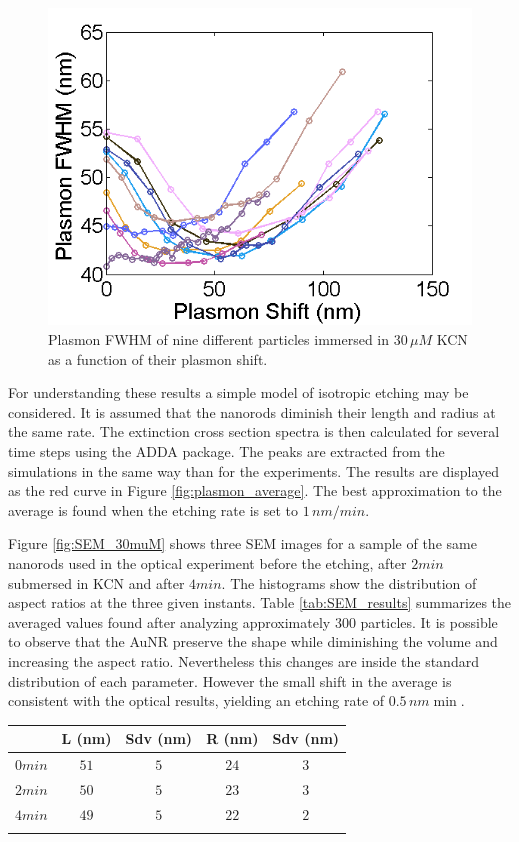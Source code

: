 \documentclass[twocolumn]{article}
\begin{document}
\begin{figure}[hbt]
 \centering
 \includegraphics[width=0.95\linewidth]{fwhm_several.png}
 \caption{Plasmon FWHM of nine different particles immersed in $30\,\mu M$ KCN
 as a function of their plasmon shift.}
 \label{fig:FWHM}
\end{figure}

For understanding these results a simple model of isotropic etching may be
considered. It is assumed that the nanorods diminish their length and radius at
the same rate. The extinction cross section spectra is then calculated for
several time steps using the ADDA package. The peaks are extracted from the
simulations in the same way than for the experiments. The results are displayed
as the red curve in Figure \ref{fig:plasmon_average}. The best approximation to
the average is found when the etching rate is set to $1\,nm/min$.

Figure \ref{fig:SEM_30muM} shows three SEM images for a sample of the same
nanorods used in the optical experiment before the etching, after $2min$
submersed in KCN and after $4min$. The histograms show the distribution of
aspect ratios at the three given instants. Table \ref{tab:SEM_results}
summarizes the averaged values found after analyzing approximately $300$
particles. It is possible to observe that the AuNR preserve the shape while
diminishing the volume and increasing the aspect ratio. Nevertheless this
changes are inside the standard distribution of each parameter. However the
small shift in the average is consistent with the optical results, yielding an
etching rate of $0.5\,nm\min$.

\begin{tabular*}{0.48\textwidth}{c c c c c}
 $\,$ & L (nm) & Sdv (nm) & R (nm) & Sdv (nm) \\\hline
 $0min$ & $51$ & $5$ & $24$ & $3$ \\ 
 $2min$ & $50$ & $5$ & $23$ & $3$ \\
 $4min$ & $49$ & $5$ & $22$ & $2$ \\
\label{tab:SEM_results}

\end{tabular*}
\end{document}
